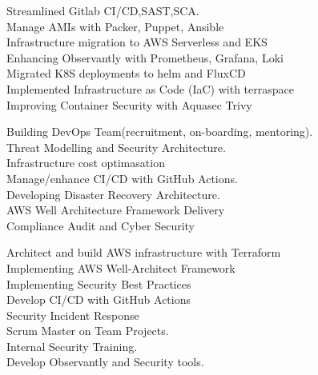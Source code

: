 \documentclass[
	a4paper,
]{fortysecondscv}
\begin{document}
\makefrontsidebar

\begin{cvtable}[2]

\end{cvtable}


\begin{cvtable}[1.5]
		{
    Streamlined Gitlab CI/CD,SAST,SCA.\\
    Manage AMIs with Packer, Puppet, Ansible\\
    Infrastructure migration to AWS Serverless and EKS\\
    Enhancing Observantly with Prometheus, Grafana, Loki\\
    Migrated K8S deployments to helm and FluxCD\\
    Implemented Infrastructure as Code (IaC) with terraspace\\
    Improving Container Security with Aquasec Trivy\\
        }

		{
    Building DevOps Team(recruitment, on-boarding, mentoring).\\
    Threat Modelling and Security Architecture.\\
    Infrastructure cost optimasation\\
    Manage/enhance CI/CD with GitHub Actions.\\
    Developing Disaster Recovery Architecture.\\
    AWS Well Architecture Framework Delivery\\
    Compliance Audit and Cyber Security\\
        }

		{
    Architect and build AWS infrastructure with Terraform\\
    Implementing AWS Well-Architect Framework\\
    Implementing Security Best Practices\\
    Develop CI/CD with GitHub Actions\\
    Security Incident Response\\
    Scrum Master on Team Projects.\\
    Internal Security Training.\\
    Develop Observantly and Security tools.
        }


\end{cvtable}
\end{document}

